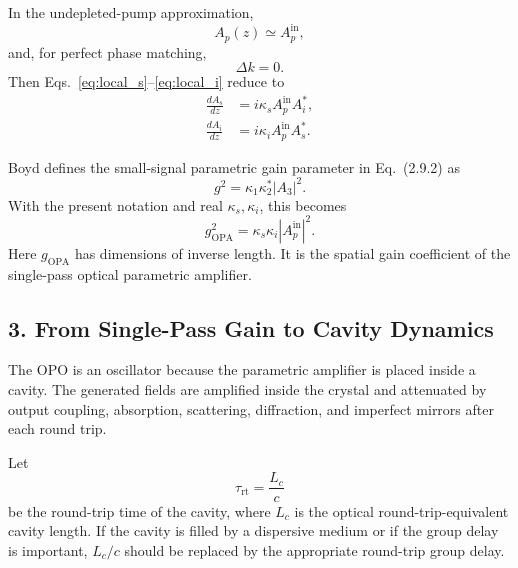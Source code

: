 \begin{resolucao}[Solution]
    In the undepleted-pump approximation,
    \begin{equation}
        A_p(z)\simeq A_p^{\mathrm{in}},
        \label{eq:undepleted_pump}
    \end{equation}
    and, for perfect phase matching,
    \begin{equation}
        \Delta k=0.
    \end{equation}
    Then Eqs.~\eqref{eq:local_s}--\eqref{eq:local_i} reduce to
    \begin{align}
        \frac{dA_s}{dz}
        &=
        i\kappa_s A_p^{\mathrm{in}}A_i^*,
        \label{eq:local_s_pm}
        \\
        \frac{dA_i}{dz}
        &=
        i\kappa_i A_p^{\mathrm{in}}A_s^*.
        \label{eq:local_i_pm}
    \end{align}

    Boyd defines the small-signal parametric gain parameter in Eq.~(2.9.2) as
    \begin{equation}
        g^2=\kappa_1\kappa_2^*|A_3|^2.
    \end{equation}
    With the present notation and real $\kappa_s,\kappa_i$, this becomes
    \begin{equation}
        g_{\mathrm{OPA}}^2
        =
        \kappa_s\kappa_i
        |A_p^{\mathrm{in}}|^2.
        \label{eq:gain_boyd_definition}
    \end{equation}
    Here $g_{\mathrm{OPA}}$ has dimensions of inverse length. It is the spatial gain coefficient of the single-pass optical parametric amplifier.

\subsection*{3. From Single-Pass Gain to Cavity Dynamics}

    The OPO is an oscillator because the parametric amplifier is placed inside a cavity. The generated fields are amplified inside the crystal and attenuated by output coupling, absorption, scattering, diffraction, and imperfect mirrors after each round trip.

    Let
    \begin{equation}
        \tau_{\mathrm{rt}}
        =
        \frac{L_c}{c}
        \label{eq:round_trip_time}
    \end{equation}
    be the round-trip time of the cavity, where $L_c$ is the optical round-trip-equivalent cavity length. If the cavity is filled by a dispersive medium or if the group delay is important, $L_c/c$ should be replaced by the appropriate round-trip group delay.


\end{resolucao}

